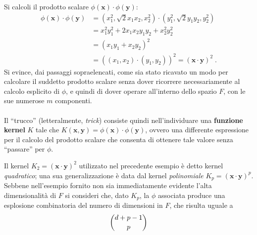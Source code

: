 Si calcoli il prodotto scalare $\phi(\boldsymbol{x}) \cdot \phi(\boldsymbol{y})$:
\begin{equation}
\begin{split}
	\phi(\boldsymbol{x}) \cdot \phi(\boldsymbol{y}) &= (x_1^2, \sqrt{2}x_1 x_2, x_2^2) \cdot (y_1^2, \sqrt{2}y_1 y_2, y_2^2) 
	\\ &= x_1^2 y_1^2 + 2 x_1 x_2 y_1 y_2 + x_2^2 y_2^2
	\\ &= (x_1 y_1 + x_2 y_2)^2
	\\ &= \left( (x_1, x_2) \cdot (y_1, y_2) \right) ^ 2 = (\boldsymbol{x} \cdot \boldsymbol{y}) ^ 2 \;. 
\end{split}
\end{equation}
Si evince, dai passaggi sopraelencati, come sia stato ricavato un modo per calcolare il suddetto prodotto scalare senza dover ricorrere necessariamente al calcolo esplicito di $\phi$, e quindi di dover operare all'interno dello spazio $F$, con le sue numerose $m$ componenti.
\paragraph{}
Il ``trucco'' (letteralmente, \textit{trick}) consiste quindi nell'individuare una \textbf{funzione kernel} $K$ tale che $K(\boldsymbol{x}, \boldsymbol{y}) = \phi(\boldsymbol{x}) \cdot \phi(\boldsymbol{y})$, ovvero una differente espressione per il calcolo del prodotto scalare che consenta di ottenere tale valore senza ``passare'' per $\phi$.

Il kernel $K_2 = (\boldsymbol{x} \cdot \boldsymbol{y}) ^ 2 $ utilizzato nel precedente esempio è detto kernel \textit{quadratico}; una sua generalizzazione è data dal kernel \textit{polinomiale} $K_p = (\boldsymbol{x} \cdot \boldsymbol{y}) ^ p$. Sebbene nell'esempio fornito non sia immediatamente evidente l'alta dimensionalità di $F$ si consideri che, dato $K_p$, la $\phi$ associata produce una esplosione combinatoria del numero di dimensioni in $F$, che risulta uguale a \cite{bing2011} \cite{tutorial}
\begin{equation}
	\binom {d + p -1} {p}
	\vspace{2mm}
\end{equation}

